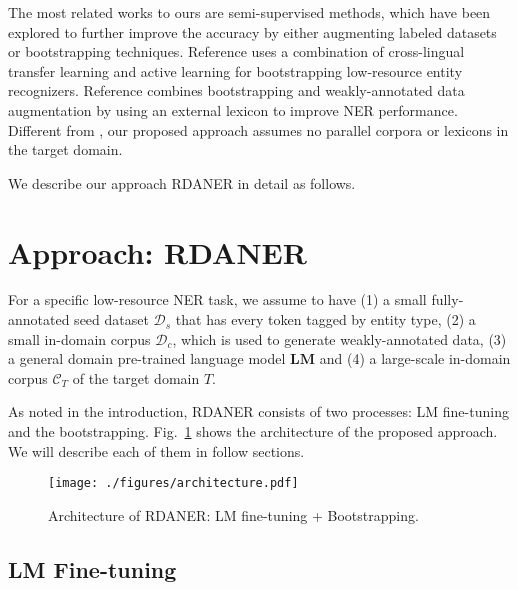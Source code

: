 \documentclass[10pt, conference, compsocconf]{IEEEtran}
\newcommand{\bert}{\textsc{Bert}\xspace}
\newcommand{\rdaner}{\textsc{RDANER}\xspace}
\newcommand{\bertbase}{$\bert_{\textsc{Base}}$\xspace}
\begin{document}
The most related works to ours are semi-supervised methods, which have been explored to further improve the accuracy 
by either augmenting labeled datasets or bootstrapping techniques\cite{he2017unified,chaudhary-etal-2019-little,mathew2019biomedical}.
Reference\cite{chaudhary-etal-2019-little} uses a combination of cross-lingual
transfer learning and active learning for bootstrapping low-resource entity
recognizers. Reference\cite{mathew2019biomedical} combines bootstrapping
and weakly-annotated data augmentation by using an external lexicon to improve NER performance.
Different from \cite{chaudhary-etal-2019-little,mathew2019biomedical}, our proposed approach assumes no
parallel corpora or lexicons in the target domain.

We describe our approach \rdaner in detail as follows.

\section{Approach: \rdaner}

For a specific low-resource NER task, we assume to have 
(1) a small fully-annotated seed dataset $\mathcal{D}_s$ that has every token
tagged by entity type, 
(2) a small in-domain corpus $\mathcal{D}_c$, which is used  to generate weakly-annotated data, 
(3) a general domain pre-trained language model $\mathbf{LM}$ and 
(4) a large-scale in-domain corpus $\mathcal{C}_T$  of the target domain $T$.

As noted in the introduction, \rdaner consists of two processes: LM
fine-tuning and the bootstrapping.
Fig.~\ref{fig:architecture} shows the architecture of the proposed approach. 
We will describe each of them in follow sections.
\begin{figure}[!t]
    \centering
    \texttt{[image: ./figures/architecture.pdf]}
    \caption{Architecture of \rdaner: LM fine-tuning + Bootstrapping.}
    \label{fig:architecture}
  \end{figure}




\subsection{LM Fine-tuning}
\end{document}
